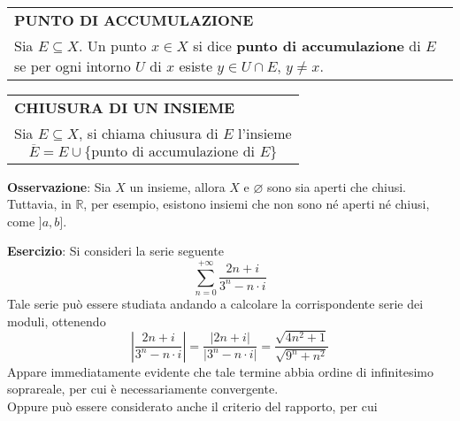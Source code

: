 \documentclass[a4paper]{extarticle}
\renewcommand\arraystretch{}
\begin{document}
\vspace{1em}
\setlength{\tabcolsep}{14pt}
\renewcommand{\arraystretch}{2}
\noindent
\begin{tabularx}{\textwidth}{@{}|P|@{}}
    \hline
    {\textbf{PUNTO DI ACCUMULAZIONE}}\\
    \parbox{\linewidth}{Sia $E \subseteq X$. Un punto $x \in X$ si dice \textbf{punto di accumulazione} di $E$ se per ogni intorno $U$ di $x$ esiste $y \in U \cap E$, $y \neq x$. \vspace{3mm}}\\
    \hline
\end{tabularx}

\vspace{1em}
\setlength{\tabcolsep}{14pt}
\renewcommand{\arraystretch}{2}
\noindent
\begin{tabularx}{\textwidth}{@{}|P|@{}}
    \hline
    {\textbf{CHIUSURA DI UN INSIEME}}\\
    \parbox{\linewidth}{Sia $E \subseteq X$, si chiama chiusura di $E$ l'insieme
    \[\overline{E} = E \cup \{\text{punto di accumulazione di } E\}\]
    \vspace{-2mm}}\\
    \hline
\end{tabularx}

\vspace{2em}
\noindent
\textbf{Osservazione}: Sia $X$ un insieme, allora $X$ e $\varnothing$ sono sia aperti che chiusi. Tuttavia, in $\mathbb{R}$, per esempio, esistono insiemi che non sono né aperti né chiusi, come $]a,b]$.

\vspace{1em}
\noindent
\textbf{Esercizio}: Si consideri la serie seguente
\[\sum_{n=0}^{+\infty} \frac{2n+i}{3^n-n \cdot i}\]
Tale serie può essere studiata andando a calcolare la corrispondente serie dei moduli, ottenendo
\[\left \vert \frac{2n+i}{3^n-n \cdot i} \right \vert = \frac{\vert 2n+i \vert}{\vert 3^n-n \cdot i \vert} = \frac{\sqrt{4n^2+1}}{\sqrt{9^n+n^2}}\]
Appare immediatamente evidente che tale termine abbia ordine di infinitesimo soprareale, per cui è necessariamente convergente.\\
Oppure può essere considerato anche il criterio del rapporto, per cui

\vspace{1em}
\noindent
\end{document}
